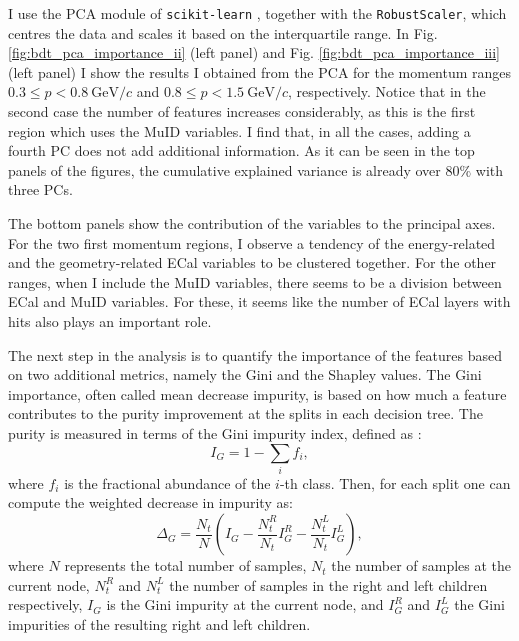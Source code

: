 I use the PCA module of \texttt{scikit-learn} \cite{scikit-learn}, together with the \texttt{RobustScaler}, which centres the data and scales it based on the interquartile range. In Fig. \ref{fig:bdt_pca_importance_ii} (left panel) and Fig. \ref{fig:bdt_pca_importance_iii} (left panel) I show the results I obtained from the PCA for the momentum ranges $0.3 \leq p < 0.8 ~ \mathrm{GeV}/c$ and $0.8 \leq p < 1.5 ~ \mathrm{GeV}/c$, respectively. Notice that in the second case the number of features increases considerably, as this is the first region which uses the MuID variables. I find that, in all the cases, adding a fourth PC does not add additional information. As it can be seen in the top panels of the figures, the cumulative explained variance is already over $80\%$ with three PCs.

The bottom panels show the contribution of the variables to the principal axes. For the two first momentum regions, I observe a tendency of the energy-related and the geometry-related ECal variables to be clustered together. For the other ranges, when I include the MuID variables, there seems to be a division between ECal and MuID variables. For these, it seems like the number of ECal layers with hits also plays an important role.

The next step in the analysis is to quantify the importance of the features based on two additional metrics, namely the Gini and the Shapley values. The Gini importance, often called mean decrease impurity, is based on how much a feature contributes to the purity improvement at the splits in each decision tree. The purity is measured in terms of the Gini impurity index, defined as \cite{Jost2006}:
\begin{equation}
	I_{G} = 1 - \sum_{i} f_{i},
\end{equation}
where $f_{i}$ is the fractional abundance of the $i$-th class. Then, for each split one can compute the weighted decrease in impurity as:
\begin{equation}
	\Delta_{G} = \frac{N_{t}}{N} \left(I_{G} - \frac{N_{t}^{R}}{N_{t}} I_{G}^{R} - \frac{N_{t}^{L}}{N_{t}} I_{G}^{L}\right),
\end{equation}
where $N$ represents the total number of samples, $N_{t}$ the number of samples at the current node, $N_{t}^{R}$ and $N_{t}^{L}$ the number of samples in the right and left children respectively, $I_{G}$ is the Gini impurity at the current node, and $I_{G}^{R}$ and $I_{G}^{L}$ the Gini impurities of the resulting right and left children.

